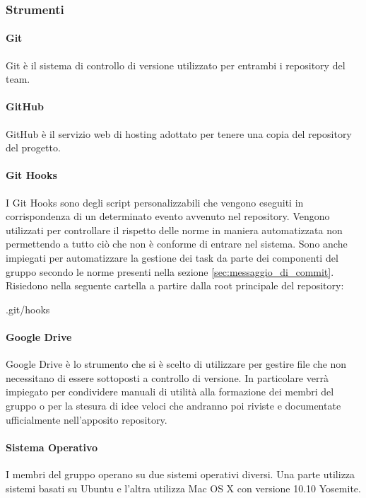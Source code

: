		\subsubsection{Strumenti}
			\paragraph{Git}
			Git è il sistema di controllo di versione utilizzato per entrambi i repository del team.
			\paragraph{GitHub}
			GitHub è il servizio web di hosting adottato per tenere una copia del repository del progetto.
			\paragraph{Git Hooks}
			I Git Hooks sono degli script personalizzabili che vengono eseguiti in corrispondenza di un determinato evento avvenuto nel repository. \newline
			Vengono utilizzati per controllare il rispetto delle norme in maniera automatizzata non permettendo a tutto ciò che non è conforme di entrare nel sistema. \newline
			Sono anche impiegati per automatizzare la gestione dei task da parte dei componenti del gruppo secondo le norme presenti nella sezione \ref{sec:messaggio_di_commit}. \newline
			Risiedono nella seguente cartella a partire dalla root principale del repository:
				\begin{center}
					.git/hooks
				\end{center}
			\paragraph{Google Drive}
			\label{sec:google_drive}
			Google Drive è lo strumento che si è scelto di utilizzare per gestire file che non necessitano di essere sottoposti a controllo di versione. \newline
			In particolare verrà impiegato per condividere manuali di utilità alla formazione dei membri del gruppo o per la stesura di idee veloci che andranno poi riviste e documentate ufficialmente nell'apposito repository.
			\paragraph{Sistema Operativo}
			I membri del gruppo operano su due sistemi operativi diversi. \newline
			Una parte utilizza sistemi basati su Ubuntu e l'altra utilizza Mac OS X con versione 10.10 Yosemite.

